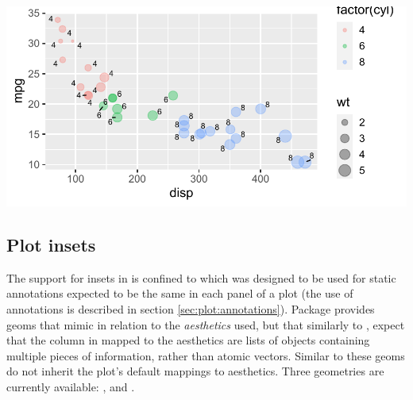 \documentclass[krantz2]{krantz}\usepackage{knitr}
\begin{document}
\begin{knitrout}\footnotesize
{}\color{fgcolor}\begin{kframe}
\begin{alltt}
\hlstd{(}  \hlstd{(}   
                           \hlstd{=} 
                           
                            \hlopt{+}
  \hlstd{()} \hlopt{+}
  \hlstd{(} \hlstd{=} \hlopt{/}\hlstd{)} \hlopt{+}
  \hlstd{(} \hlstd{=} \hlstd{,}  \hlstd{=} \hlstd{,}
                   \hlstd{=} \hlstd{,}  \hlstd{=} \hlstd{)}
\end{alltt}
\end{kframe}

{\centering \includegraphics[width=.7\textwidth]{figure/pos-repel-plot-01-1} 

}



\end{knitrout}

\subsection{Plot insets}\label{sec:plot:insets}

The support for insets in  is confined to  which was designed to be used for static annotations expected to be the same in each panel of a plot (the use of annotations is described in section \ref{sec:plot:annotations}). Package  provides geoms that mimic  in relation to the \emph{aesthetics} used, but that similarly to , expect that the column in  mapped to the  aesthetics are lists of objects containing multiple pieces of information, rather than atomic vectors. Similar to  these geoms do not inherit the plot's default mappings to aesthetics. Three geometries are currently available: ,  and .
\end{document}

